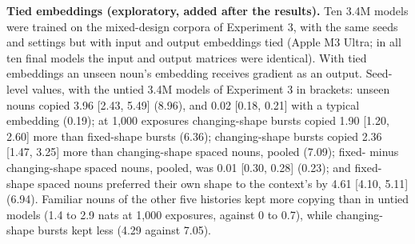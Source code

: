 \textbf{Tied embeddings (exploratory, added after the results).} Ten 3.4M models were trained on the mixed-design corpora of Experiment 3, with the same seeds and settings but with input and output embeddings tied (Apple M3 Ultra; in all ten final models the input and output matrices were identical). With tied embeddings an unseen noun's embedding receives gradient as an output. Seed-level values, with the untied 3.4M models of Experiment 3 in brackets: unseen nouns copied 3.96 [2.43, 5.49] (8.96), and 0.02 [\textminus{}0.18, 0.21] with a typical embedding (\textminus{}0.19); at 1,000 exposures changing-shape bursts copied 1.90 [1.20, 2.60] more than fixed-shape bursts (6.36); changing-shape bursts copied 2.36 [1.47, 3.25] more than changing-shape spaced nouns, pooled (7.09); fixed- minus changing-shape spaced nouns, pooled, was \textminus{}0.01 [\textminus{}0.30, 0.28] (\textminus{}0.23); and fixed-shape spaced nouns preferred their own shape to the context's by 4.61 [4.10, 5.11] (6.94). Familiar nouns of the other five histories kept more copying than in untied models (1.4 to 2.9 nats at 1,000 exposures, against 0 to 0.7), while changing-shape bursts kept less (4.29 against 7.05).

